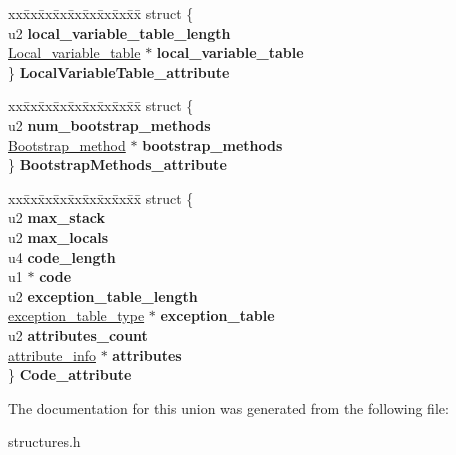 \begin{DoxyCompactItemize}
\begin{tabbing}
\end{tabbing}\item 
\begin{tabbing}
xx\=xx\=xx\=xx\=xx\=xx\=xx\=xx\=xx\=\kill
struct \{\\
\>u2 {\bfseries local\_variable\_table\_length}\\
\>\hyperlink{structLocal__variable__table}{Local\_variable\_table} $\ast$ {\bfseries local\_variable\_table}\\
\} {\bfseries LocalVariableTable\_attribute}\hypertarget{unionattribute__types_a14bd080c2d4d5c855107ac67c2c3627c}{}\label{unionattribute__types_a14bd080c2d4d5c855107ac67c2c3627c}
\\

\end{tabbing}\item 
\begin{tabbing}
xx\=xx\=xx\=xx\=xx\=xx\=xx\=xx\=xx\=\kill
struct \{\\
\>u2 {\bfseries num\_bootstrap\_methods}\\
\>\hyperlink{structBootstrap__method}{Bootstrap\_method} $\ast$ {\bfseries bootstrap\_methods}\\
\} {\bfseries BootstrapMethods\_attribute}\hypertarget{unionattribute__types_ab7d4f09668c4f457a4a5e76d31a961e5}{}\label{unionattribute__types_ab7d4f09668c4f457a4a5e76d31a961e5}
\\

\end{tabbing}\item 
\begin{tabbing}
xx\=xx\=xx\=xx\=xx\=xx\=xx\=xx\=xx\=\kill
struct \{\\
\>u2 {\bfseries max\_stack}\\
\>u2 {\bfseries max\_locals}\\
\>u4 {\bfseries code\_length}\\
\>u1 $\ast$ {\bfseries code}\\
\>u2 {\bfseries exception\_table\_length}\\
\>\hyperlink{structexception__table__type}{exception\_table\_type} $\ast$ {\bfseries exception\_table}\\
\>u2 {\bfseries attributes\_count}\\
\>\hyperlink{structattribute__info}{attribute\_info} $\ast$ {\bfseries attributes}\\
\} {\bfseries Code\_attribute}\hypertarget{unionattribute__types_a4d78dcb1862f185b0d2eff1ce96aec71}{}\label{unionattribute__types_a4d78dcb1862f185b0d2eff1ce96aec71}
\\

\end{tabbing}\end{DoxyCompactItemize}


The documentation for this union was generated from the following file\+:\begin{DoxyCompactItemize}
\item 
structures.\+h\end{DoxyCompactItemize}
